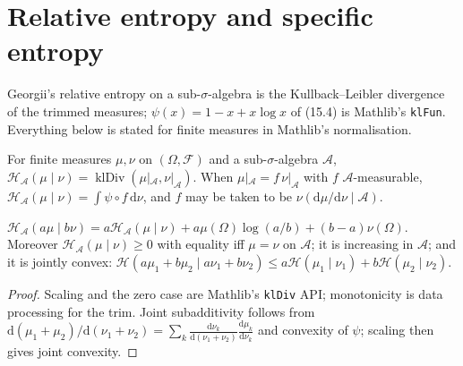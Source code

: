 \section{Relative entropy and specific entropy}

Georgii's relative entropy on a sub-$\sigma$-algebra is the Kullback--Leibler divergence of the
trimmed measures; $\psi(x) = 1 - x + x\log x$ of (15.4) is Mathlib's \texttt{klFun}. Everything
below is stated for finite measures in Mathlib's normalisation.

\begin{definition}[Georgii (15.1)]
    \label{def:ent-relative}
    \leanok

    For finite measures $\mu, \nu$ on $(\Omega, \mathcal{F})$ and a sub-$\sigma$-algebra
    $\mathcal{A}$, $\mathcal{H}_{\mathcal{A}}(\mu \mid \nu) = \operatorname{klDiv}(\mu|_{\mathcal{A}}, \nu|_{\mathcal{A}})$.
    When $\mu|_{\mathcal{A}} = f \, \nu|_{\mathcal{A}}$ with $f$ $\mathcal{A}$-measurable,
    $\mathcal{H}_{\mathcal{A}}(\mu \mid \nu) = \int \psi \circ f \, \mathrm{d}\nu$, and $f$ may be
    taken to be $\nu(\mathrm{d}\mu/\mathrm{d}\nu \mid \mathcal{A})$.
\end{definition}

\begin{proposition}[Georgii (15.2), (15.5)]
    \label{prop:ent-155}
    \leanok

    $\mathcal{H}_{\mathcal{A}}(a\mu \mid b\nu) = a\mathcal{H}_{\mathcal{A}}(\mu\mid\nu) +
    a\mu(\Omega)\log(a/b) + (b-a)\nu(\Omega)$. Moreover $\mathcal{H}_{\mathcal{A}}(\mu\mid\nu) \ge 0$
    with equality iff $\mu = \nu$ on $\mathcal{A}$; it is increasing in $\mathcal{A}$; and it is
    jointly convex: $\mathcal{H}(a\mu_1 + b\mu_2 \mid a\nu_1 + b\nu_2) \le
    a\mathcal{H}(\mu_1\mid\nu_1) + b\mathcal{H}(\mu_2\mid\nu_2)$.
\end{proposition}
\begin{proof}
    \leanok

    Scaling and the zero case are Mathlib's \texttt{klDiv} API; monotonicity is data processing
    for the trim. Joint subadditivity follows from $\mathrm{d}(\mu_1+\mu_2)/\mathrm{d}(\nu_1+\nu_2)
    = \sum_k \frac{\mathrm{d}\nu_k}{\mathrm{d}(\nu_1+\nu_2)} \frac{\mathrm{d}\mu_k}{\mathrm{d}\nu_k}$
    and convexity of $\psi$; scaling then gives joint convexity.
\end{proof}

